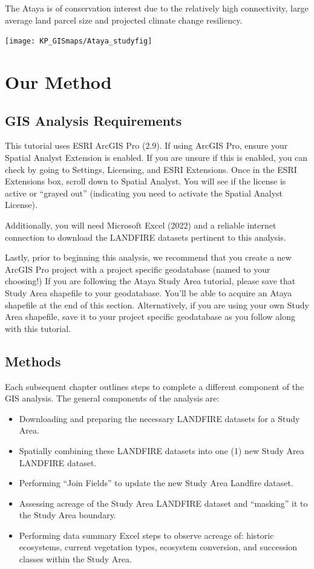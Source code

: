 \documentclass[
]{book}
\providecommand{\tightlist}{%
  \setlength{\itemsep}{0pt}\setlength{\parskip}{0pt}}
\begin{document}
The Ataya is of conservation interest due to the relatively high connectivity, large average land parcel size and projected climate change resiliency.

\texttt{[image: KP\_GISmaps/Ataya\_studyfig]}

\hypertarget{ourmethods}{%
\chapter{Our Method}\label{ourmethods}}

\hypertarget{gis-analysis-requirements}{%
\section{GIS Analysis Requirements}\label{gis-analysis-requirements}}

This tutorial uses ESRI ArcGIS Pro (2.9). If using ArcGIS Pro, ensure your Spatial Analyst Extension is enabled. If you are unsure if this is enabled, you can check by going to Settings, Licensing, and ESRI Extensions. Once in the ESRI Extensions box, scroll down to Spatial Analyst. You will see if the license is active or ``grayed out'' (indicating you need to activate the Spatial Analyst License).

Additionally, you will need Microsoft Excel (2022) and a reliable internet connection to download the LANDFIRE datasets pertinent to this analysis.

Lastly, prior to beginning this analysis, we recommend that you create a new ArcGIS Pro project with a project specific geodatabase (named to your choosing!) If you are following the Ataya Study Area tutorial, please save that Study Area shapefile to your geodatabase. You'll be able to acquire an Ataya shapefile at the end of this section. Alternatively, if you are using your own Study Area shapefile, save it to your project specific geodatabase as you follow along with this tutorial.

\hypertarget{methods}{%
\section{Methods}\label{methods}}

Each subsequent chapter outlines steps to complete a different component of the GIS analysis. The general components of the analysis are:

\begin{itemize}
\tightlist
\item
  Downloading and preparing the necessary LANDFIRE datasets for a Study Area.
\item
  Spatially combining these LANDFIRE datasets into one (1) new Study Area LANDFIRE dataset.
\item
  Performing ``Join Fields'' to update the new Study Area Landfire dataset.
\item
  Assessing acreage of the Study Area LANDFIRE dataset and ``masking'' it to the Study Area boundary.
\item
  Performing data summary Excel steps to observe acreage of: historic ecosystems, current vegetation types, ecosystem conversion, and succession classes within the Study Area.
\end{itemize}
\end{document}
